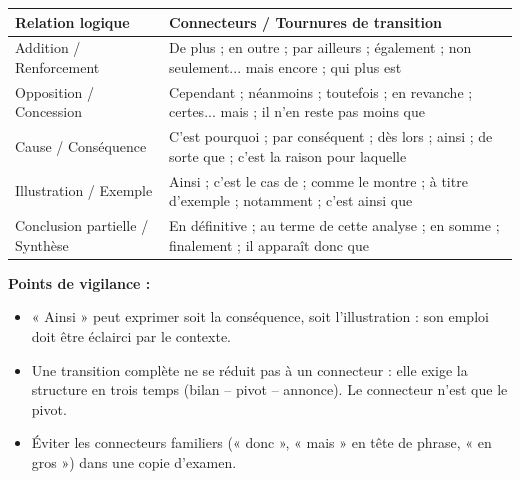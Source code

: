 \documentclass[11pt]{article}
\begin{document}
\begin{corrige}
\begin{center}
\begin{tabularx}{\linewidth}{|l|X|}\hline
\rowcolor{popblueL}\textbf{Relation logique} & \textbf{Connecteurs / Tournures de transition} \\ \hline
Addition / Renforcement & De plus ; en outre ; par ailleurs ; également ; non seulement... mais encore ; qui plus est \\ \hline
Opposition / Concession & Cependant ; néanmoins ; toutefois ; en revanche ; certes... mais ; il n'en reste pas moins que \\ \hline
Cause / Conséquence & C'est pourquoi ; par conséquent ; dès lors ; ainsi ; de sorte que ; c'est la raison pour laquelle \\ \hline
Illustration / Exemple & Ainsi ; c'est le cas de ; comme le montre ; à titre d'exemple ; notamment ; c'est ainsi que \\ \hline
Conclusion partielle / Synthèse & En définitive ; au terme de cette analyse ; en somme ; finalement ; il apparaît donc que \\ \hline
\end{tabularx}
\end{center}
\textbf{Points de vigilance :}
\begin{itemize}
\item « Ainsi » peut exprimer soit la conséquence, soit l'illustration : son emploi doit être éclairci par le contexte.
\item Une transition complète ne se réduit pas à un connecteur : elle exige la structure en trois temps (bilan -- pivot -- annonce). Le connecteur n'est que le pivot.
\item Éviter les connecteurs familiers (« donc », « mais » en tête de phrase, « en gros ») dans une copie d'examen.
\end{itemize}
\end{corrige}
\end{document}
